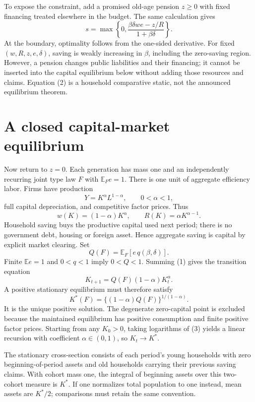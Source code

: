 \documentclass[11pt]{article}
\newcommand{\E}{\mathbb E}
\begin{document}
To expose the constraint, add a promised old-age pension $z\geq0$ with fixed financing treated elsewhere in the budget. The same calculation gives
\[
 s=\max\left\{0,\frac{\beta\delta we-z/R}{1+\beta\delta}\right\}. \tag{2}
\]
At the boundary, optimality follows from the one-sided derivative. For fixed $(w,R,z,e,\delta)$, saving is weakly increasing in $\beta$, including the zero-saving region. However, a pension changes public liabilities and their financing; it cannot be inserted into the capital equilibrium below without adding those resources and claims. Equation (2) is a household comparative static, not the announced equilibrium theorem.

\section*{A closed capital-market equilibrium}
Now return to $z=0$. Each generation has mass one and an independently recurring joint type law $F$ with $\E_F e=1$. There is one unit of aggregate efficiency labor. Firms have production
\[
 Y=K^\alpha L^{1-\alpha},\qquad0<\alpha<1,
\]
full capital depreciation, and competitive factor prices. Thus
\[
 w(K)=(1-\alpha)K^\alpha,\qquad R(K)=\alpha K^{\alpha-1}.
\]
Household saving buys the productive capital used next period; there is no government debt, housing or foreign asset. Hence aggregate saving is capital by explicit market clearing. Set
\[
 Q(F)=\E_F[e\,q(\beta,\delta)].
\]
Finite $\E e=1$ and $0<q<1$ imply $0<Q<1$. Summing (1) gives the transition equation
\[
 K_{t+1}=Q(F)(1-\alpha)K_t^\alpha.                    \tag{3}
\]
A positive stationary equilibrium must therefore satisfy
\[
 K^*(F)=\{(1-\alpha)Q(F)\}^{1/(1-\alpha)}.            \tag{4}
\]
It is the unique positive solution. The degenerate zero-capital point is excluded because the maintained equilibrium has positive consumption and finite positive factor prices. Starting from any $K_0>0$, taking logarithms of (3) yields a linear recursion with coefficient $\alpha\in(0,1)$, so $K_t\to K^*$.

The stationary cross-section consists of each period's young households with zero beginning-of-period assets and old households carrying their previous saving claims. With cohort mass one, the integral of beginning assets over this two-cohort measure is $K^*$. If one normalizes total population to one instead, mean assets are $K^*/2$; comparisons must retain the same convention.
\end{document}
